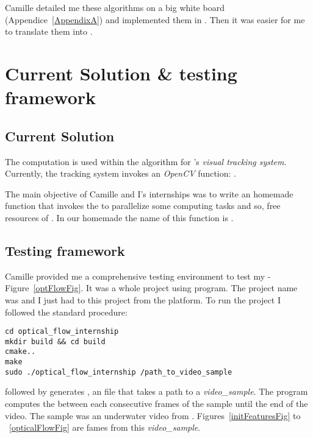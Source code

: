 Camille detailed me these algorithms on a big white board (Appendice~\ref{AppendixA}) and implemented them in . Then it was easier for me to translate them into .
\newpage


\section{Current Solution \& testing framework}

\subsection{Current Solution}

The \flow{} computation is used within the  algorithm for \iBubble's \emph{visual tracking system}. Currently, the tracking system invokes an \emph{OpenCV} function: .

The main objective of Camille and I's internships was to write an homemade  function that invokes the \vc{} to parallelize some computing tasks and so, free resources of \cpu. In our homemade \api{} the name of this function is .


\subsection{Testing framework}

Camille provided me a comprehensive testing environment to test my \api{} - Figure~\ref{optFlowFig}. It was a whole  project using  program. The project name was  and I just had to  this project from the  platform. To run the project I followed the standard  procedure:


\begin{lstlisting}
cd optical_flow_internship
mkdir build && cd build
cmake..
make
sudo ./optical_flow_internship /path_to_video_sample
\end{lstlisting}


 followed by  generates , an  file that takes a path to a \emph{video\_sample}. The program computes the \flow{} between each consecutive frames of the sample until the end of the video. The sample was an underwater video from \iBubble. Figures~\ref{initFeaturesFig} to ~\ref{opticalFlowFig} are fames from this \emph{video\_sample}.

